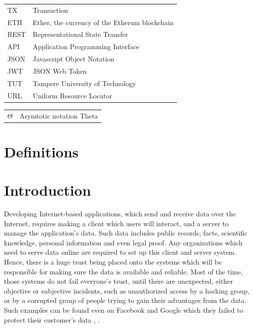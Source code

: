 \documentclass[twoside,numperchapter]{tutthesis} %
\begin{document}

\begin{tabular}[h]{@{} p{} p{} @{}}
TX & Transaction \\
ETH & Ether, the currency of the Etherum blockchain \\
REST & Representational State Transfer \\ 
API & Application Programming Interface \\
JSON & Javascript Object Notation \\
JWT & JSON Web Token \\
TUT & Tampere University of Technology \\
URL & Uniform Resource Locator 
\end{tabular}

\begin{tabular}[h]{@{} p{} p{} @{}}
$\Theta$ & Asymtotic notation Theta \\
\end{tabular}

\chapter*{Definitions}


\chapter{Introduction}
\label{ch:Introduction}

Developing Internet-based applications, which send and receive data over the Internet, requires making a client which users will interact, and a server to manage the application's data. Such data includes public records, facts, scientific knowledge, personal information and even legal proof. Any organizations which need to serve data online are required to set up this client and server system. Hence, there is a huge trust being placed onto the systems which will be responsible for making sure the data is available and reliable. Most of the time, those systems do not fail everyone's trust, until there are unexpected, either objective or subjective incidents, such as unauthorized access by a hacking group, or by a corrupted group of people trying to gain their advantages from the data. Such examples can be found even on Facebook and Google which they failed to protect their customer's data \citep{FacebookLeakData}, \citep{GoogleLeakData}.
\end{document}
